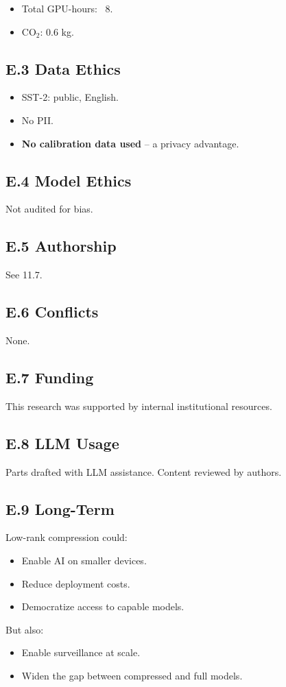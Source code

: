 \begin{itemize}
\item Total GPU-hours: ~8.
\item CO$_2$: 0.6 kg.

\end{itemize}
\subsection{E.3 Data Ethics}

\begin{itemize}
\item SST-2: public, English.
\item No PII.
\item \textbf{No calibration data used} -- a privacy advantage.

\end{itemize}
\subsection{E.4 Model Ethics}

Not audited for bias.

\subsection{E.5 Authorship}

See  11.7.

\subsection{E.6 Conflicts}

None.

\subsection{E.7 Funding}

This research was supported by internal institutional resources.

\subsection{E.8 LLM Usage}

Parts drafted with LLM assistance. Content reviewed by authors.

\subsection{E.9 Long-Term}

Low-rank compression could:
\begin{itemize}
\item Enable AI on smaller devices.
\item Reduce deployment costs.
\item Democratize access to capable models.

\end{itemize}
But also:
\begin{itemize}
\item Enable surveillance at scale.
\item Widen the gap between compressed and full models.

\end{itemize}
